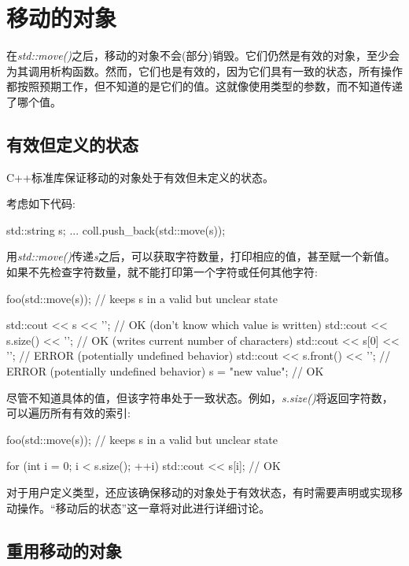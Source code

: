 \section{移动的对象}
在\textit{std::move()}之后，移动的对象不会(部分)销毁。它们仍然是有效的对象，至少会为其调用析构函数。然而，它们也是有效的，因为它们具有一致的状态，所有操作都按照预期工作，但不知道的是它们的值。这就像使用类型的参数，而不知道传递了哪个值。

\subsection{有效但定义的状态}

C++标准库保证移动的对象处于有效但未定义的状态。

考虑如下代码:

\begin{cppcode}
std::string s;
...
coll.push_back(std::move(s));
\end{cppcode}

用\textit{std::move()}传递\textit{s}之后，可以获取字符数量，打印相应的值，甚至赋一个新值。如果不先检查字符数量，就不能打印第一个字符或任何其他字符:

\begin{cppcode}
foo(std::move(s)); // keeps s in a valid but unclear state

std::cout << s << '\n'; // OK (don’t know which value is written)
std::cout << s.size() << '\n'; // OK (writes current number of characters)
std::cout << s[0] << '\n'; // ERROR (potentially undefined behavior)
std::cout << s.front() << '\n'; // ERROR (potentially undefined behavior)
s = "new value"; // OK
\end{cppcode}

尽管不知道具体的值，但该字符串处于一致状态。例如，\textit{s.size()}将返回字符数，可以遍历所有有效的索引:

\begin{cppcode}
foo(std::move(s)); // keeps s in a valid but unclear state

for (int i = 0; i < s.size(); ++i) {
	std::cout << s[i]; // OK
}
\end{cppcode}

对于用户定义类型，还应该确保移动的对象处于有效状态，有时需要声明或实现移动操作。“移动后的状态”这一章将对此进行详细讨论。

\subsection{重用移动的对象}

